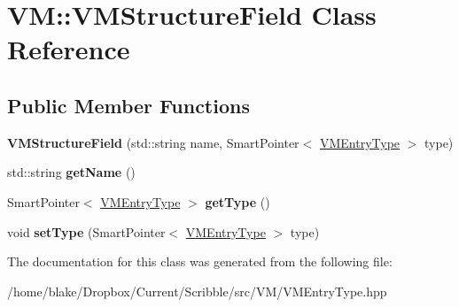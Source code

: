 \hypertarget{class_v_m_1_1_v_m_structure_field}{\section{V\-M\-:\-:V\-M\-Structure\-Field Class Reference}
\label{class_v_m_1_1_v_m_structure_field}
}
\subsection*{Public Member Functions}
\begin{DoxyCompactItemize}
\item 
\hypertarget{class_v_m_1_1_v_m_structure_field_a44d42e3f26403a7d9b909f215a1f6f19}{{\bfseries V\-M\-Structure\-Field} (std\-::string name, Smart\-Pointer$<$ \hyperlink{class_v_m_1_1_v_m_entry_type}{V\-M\-Entry\-Type} $>$ type)}\label{class_v_m_1_1_v_m_structure_field_a44d42e3f26403a7d9b909f215a1f6f19}

\item 
\hypertarget{class_v_m_1_1_v_m_structure_field_aaaad2973e28ce448112892125df2994c}{std\-::string {\bfseries get\-Name} ()}\label{class_v_m_1_1_v_m_structure_field_aaaad2973e28ce448112892125df2994c}

\item 
\hypertarget{class_v_m_1_1_v_m_structure_field_ad686a68c733805ba1ed330886ef78b43}{Smart\-Pointer$<$ \hyperlink{class_v_m_1_1_v_m_entry_type}{V\-M\-Entry\-Type} $>$ {\bfseries get\-Type} ()}\label{class_v_m_1_1_v_m_structure_field_ad686a68c733805ba1ed330886ef78b43}

\item 
\hypertarget{class_v_m_1_1_v_m_structure_field_a0e05c782e52de8e3ed8ecb7b96fc4cf3}{void {\bfseries set\-Type} (Smart\-Pointer$<$ \hyperlink{class_v_m_1_1_v_m_entry_type}{V\-M\-Entry\-Type} $>$ type)}\label{class_v_m_1_1_v_m_structure_field_a0e05c782e52de8e3ed8ecb7b96fc4cf3}

\end{DoxyCompactItemize}


The documentation for this class was generated from the following file\-:\begin{DoxyCompactItemize}
\item 
/home/blake/\-Dropbox/\-Current/\-Scribble/src/\-V\-M/V\-M\-Entry\-Type.\-hpp\end{DoxyCompactItemize}
